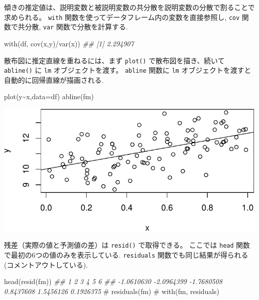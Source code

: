 \documentclass[
  letterpaper,
  xelatex,
  ja=standard, xelatex]{bxjsbook}
\newenvironment{Shaded}{\begin{snugshade}}{\end{snugshade}}
\newcommand{\AttributeTok}[1]{\textcolor[rgb]{0.40,0.45,0.13}{#1}}
\newcommand{\CommentTok}[1]{\textcolor[rgb]{0.37,0.37,0.37}{#1}}
\newcommand{\DocumentationTok}[1]{\textcolor[rgb]{0.37,0.37,0.37}{\textit{#1}}}
\newcommand{\FunctionTok}[1]{\textcolor[rgb]{0.28,0.35,0.67}{#1}}
\newcommand{\NormalTok}[1]{\textcolor[rgb]{0.00,0.23,0.31}{#1}}
\newcommand{\SpecialCharTok}[1]{\textcolor[rgb]{0.37,0.37,0.37}{#1}}
\begin{document}
傾きの推定値は、説明変数と被説明変数の共分散を説明変数の分散で割ることで求められる。
\texttt{with} 関数を使ってデータフレーム内の変数を直接参照し,
\texttt{cov} 関数で共分散, \texttt{var} 関数で分散を計算する.

\begin{Shaded}
\begin{Highlighting}[]
\FunctionTok{with}\NormalTok{(df, }\FunctionTok{cov}\NormalTok{(x,y)}\SpecialCharTok{/}\FunctionTok{var}\NormalTok{(x))}
\DocumentationTok{\#\# [1] 2.294907}
\end{Highlighting}
\end{Shaded}

散布図に推定直線を重ねるには、まず \texttt{plot()}
で散布図を描き、続いて \texttt{abline()} に \texttt{lm}
オブジェクトを渡す。 \texttt{abline} 関数に \texttt{lm}
オブジェクトを渡すと自動的に回帰直線が描画される.

\begin{Shaded}
\begin{Highlighting}[]
\FunctionTok{plot}\NormalTok{(y}\SpecialCharTok{\textasciitilde{}}\NormalTok{x,}\AttributeTok{data=}\NormalTok{df)}
\FunctionTok{abline}\NormalTok{(fm)}
\end{Highlighting}
\end{Shaded}

\includegraphics{07-regression1_files/figure-pdf/unnamed-chunk-8-1.pdf}

残差（実際の値と予測値の差）は \texttt{resid()} で取得できる。 ここでは
\texttt{head} 関数で最初の6つの値のみを表示している. \texttt{residuals}
関数でも同じ結果が得られる (コメントアウトしている).

\begin{Shaded}
\begin{Highlighting}[]
\FunctionTok{head}\NormalTok{(}\FunctionTok{resid}\NormalTok{(fm))}
\DocumentationTok{\#\#          1          2          3          4          5          6 }
\DocumentationTok{\#\# {-}1.0610630 {-}2.0964399 {-}1.7680508  0.8437608  1.5456126  0.1926375}
\CommentTok{\# residuals(fm)}
\CommentTok{\# with(fm, residuals)}
\end{Highlighting}
\end{Shaded}
\end{document}
